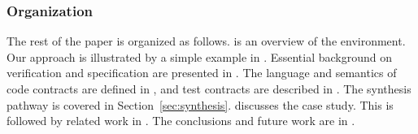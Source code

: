 \subsubsection*{Organization}
The rest of the paper is organized as follows.
 is an overview of the {\brfcs} environment.
Our approach is illustrated by a simple example in
. Essential background on {\agr} verification and specification are
presented in .  The language and semantics of code
contracts are defined in , and test
contracts are described in .  The synthesis pathway
is covered in Section~\ref{sec:synthesis}.
 discusses the case study.
This is followed by related work in .
The conclusions and future work are in .

\begin{comment}
  BriefCASE incorporates model-level cyber analysis tools (presently
  GearCASE~\cite{gearcase2020} and DCRYPPS~\cite{dcrypps2019}) which can
  examine AADL models for potential vulnerabilities and suggest
  cyber-security requirements to mitigate them.  A library of
  architectural transforms guides the system engineer through automated
  model transformations that modify the architecture to address these
  requirements, possibly inserting new high-assurance components into
  the system.  Implementations for the new components are synthesized
  from formal specifications using
  SPLAT~\cite{slind-hcss2020},~\cite{formal-filter-synth-langsec}
  (Semantic Properties for Language and Automata Theory).


  Formal
  verification that the transformed system model meets its requirements
  is accomplished via \agr~\cite{agree2013} (Assume Guarantee Reasoning
  Environment).
  \agr\ is a {\em compositional assume-guarantee} style model checker
  for AADL models that attempts to prove properties about one layer of
  an architecture using properties allocated to its subcomponents.
  Cyber-resilient code implementing the verified model is then
  automatically generated using the High Assurance Modeling and Rapid
  Engineering for Embedded Systems (HAMR) toolkit~\cite{hamr}.  If
  desired, this code can be targeted to the formally verified seL4
  secure microkernel~\cite{sel4-2009}.
\end{comment}
